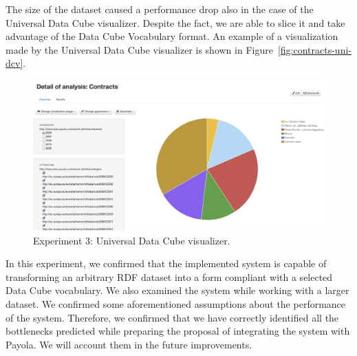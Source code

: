 The size of the dataset caused a performance drop also in the case of the
Universal Data Cube visualizer. Despite the fact, we are able to slice it and 
take advantage of the Data Cube Vocabulary format. An example of a visualization 
made by the Universal Data Cube visualizer is shown in 
Figure~\ref{fig:contracts-uni-dcv}.

\begin{figure}
  \centering
  \includegraphics[width=140mm]{img/contracts-uni-dcv.png}
  \caption{Experiment 3: Universal Data Cube visualizer.}
  \label{fig:contracts-uni-dcv.}
\end{figure}

In this experiment, we confirmed that the implemented system is capable of 
transforming an arbitrary RDF dataset into a form compliant with a selected Data 
Cube vocabulary. We also examined the system while working with a larger 
dataset. We confirmed some aforementioned assumptions about the performance of 
the system. Therefore, we confirmed that we have correctly identified all the 
bottlenecks predicted while preparing the proposal of integrating the system with Payola. 
We will account them in the future improvements.

